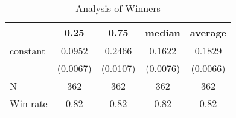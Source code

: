 \begin{table}
\caption{Analysis of Winners}
\begin{center}
\begin{tabular}{lcccc}
\hline
         &   0.25   &   0.75   &  median  & average   \\
\midrule
\midrule
constant & 0.0952   & 0.2466   & 0.1622   & 0.1829    \\
         & (0.0067) & (0.0107) & (0.0076) & (0.0066)  \\
N        & 362      & 362      & 362      & 362       \\
Win rate & 0.82     & 0.82     & 0.82     & 0.82      \\
\hline
\end{tabular}
\end{center}
\end{table}